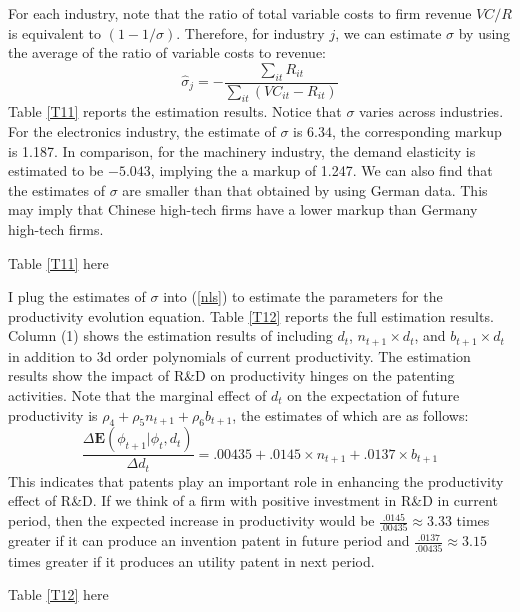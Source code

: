 \documentclass[English]{article}
\begin{document}
For each industry, note that the ratio of total
variable costs to firm revenue $VC/R$ is equivalent to $\left(1-1/\sigma \right)$.
Therefore, for industry $j$, we can estimate $\sigma$ by using the
average of the ratio of variable costs to revenue:
\begin{equation}
\hat{\sigma}_{j}=-\frac{\sum_{it}R_{it}}{\sum_{it}(VC_{it}-R_{it})}
\end{equation}
Table \ref{T11} reports the estimation results. Notice that $\sigma$
varies across industries. For the electronics industry, the estimate of
$\sigma$ is $6.34$, the corresponding markup is 1.187. In comparison,
for the machinery industry, the demand elasticity is estimated
to be $-5.043$, implying the a markup of 1.247. We can also find
that the estimates of $\sigma$ are smaller than that obtained by
\citet{Peters2017} using German data.
This may imply that Chinese high-tech firms have a lower markup than
Germany high-tech firms. 

\begin{center}
Table \ref{T11} here
\par\end{center}

I plug the estimates of $\sigma$ into (\ref{nls}) to estimate the
parameters for the productivity evolution equation.
Table \ref{T12} reports the full estimation results. Column (1) shows
the estimation results of including $d_{t}$, $n_{t+1} \times d_{t}$,
and $b_{t+1} \times d_{t}$ in addition to 3d order polynomials of
current productivity. The estimation results show the impact of R\&D on productivity hinges
on the patenting activities. Note that the marginal effect of $d_{t}$
on the expectation of future productivity is $\rho_{4}+\rho_{5}n_{t+1}+\rho_{6}b_{t+1}$, the estimates of which are as follows:
\[
\frac{\Delta\mathbf{E}\left(\phi_{t+1}|\phi_{t},d_{t}\right)}{\Delta d_{t}}=.00435+.0145\times n_{t+1}+.0137\times b_{t+1}
\]
This indicates that patents play an important role in enhancing the
productivity effect of R\&D. If we think of a firm with
positive investment in R\&D in current period, then the expected increase
in productivity would be $\frac{.0145}{.00435}\approx 3.33$ times
greater if it can produce an invention patent in future period and
$\frac{.0137}{.00435}\approx 3.15$ times greater if it produces an utility
patent in next period. 
\begin{center}
Table \ref{T12} here
\par\end{center}
\end{document}

